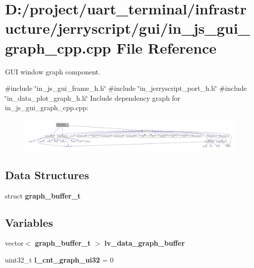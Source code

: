 \section{D\+:/project/uart\+\_\+terminal/infrastructure/jerryscript/gui/in\+\_\+js\+\_\+gui\+\_\+graph\+\_\+cpp.cpp File Reference}
\label{in__js__gui__graph__cpp_8cpp}


G\+UI window graph component.  


{\ttfamily \#include \char`\"{}in\+\_\+js\+\_\+gui\+\_\+frame\+\_\+h.\+h\char`\"{}}\newline
{\ttfamily \#include \char`\"{}in\+\_\+jerryscript\+\_\+port\+\_\+h.\+h\char`\"{}}\newline
{\ttfamily \#include \char`\"{}in\+\_\+data\+\_\+plot\+\_\+graph\+\_\+h.\+h\char`\"{}}\newline
Include dependency graph for in\+\_\+js\+\_\+gui\+\_\+graph\+\_\+cpp.\+cpp\+:\nopagebreak
\begin{figure}[H]
\begin{center}
\leavevmode
\includegraphics[width=350pt]{in__js__gui__graph__cpp_8cpp__incl}
\end{center}
\end{figure}
\subsection*{Data Structures}
\begin{DoxyCompactItemize}
\item 
struct \textbf{ graph\+\_\+buffer\+\_\+t}
\end{DoxyCompactItemize}
\subsection*{Variables}
\begin{DoxyCompactItemize}
\item 
vector$<$ \textbf{ graph\+\_\+buffer\+\_\+t} $>$ \textbf{ lv\+\_\+data\+\_\+graph\+\_\+buffer}
\item 
uint32\+\_\+t {\bfseries l\+\_\+cnt\+\_\+graph\+\_\+ui32} = 0
\end{DoxyCompactItemize}



